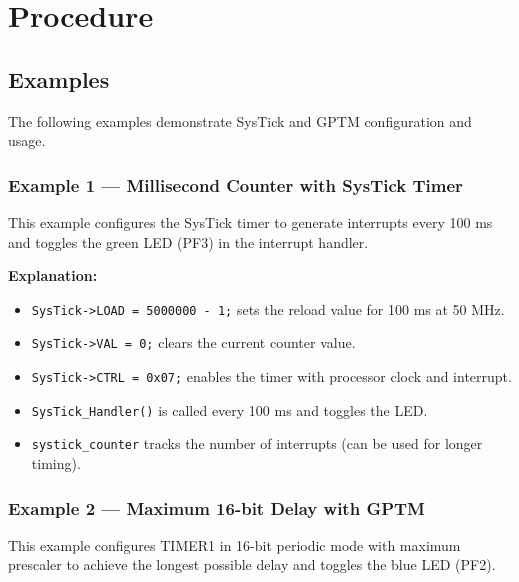 \newpage
\section{Procedure}

\subsection{Examples}

The following examples demonstrate SysTick and GPTM configuration and usage.

\subsubsection{Example 1 — Millisecond Counter with SysTick Timer}

This example configures the SysTick timer to generate interrupts every 100 ms and toggles the green LED (PF3) in the interrupt handler.



\noindent
\textbf{Explanation:}
\begin{itemize}[nosep]
  \item \texttt{SysTick->LOAD = 5000000 - 1;} sets the reload value for 100 ms at 50 MHz.
  \item \texttt{SysTick->VAL = 0;} clears the current counter value.
  \item \texttt{SysTick->CTRL = 0x07;} enables the timer with processor clock and interrupt.
  \item \texttt{SysTick\_Handler()} is called every 100 ms and toggles the LED.
  \item \texttt{systick\_counter} tracks the number of interrupts (can be used for longer timing).
\end{itemize}

\newpage
\subsubsection{Example 2 — Maximum 16-bit Delay with GPTM}

This example configures TIMER1 in 16-bit periodic mode with maximum prescaler to achieve the longest possible delay and toggles the blue LED (PF2).



